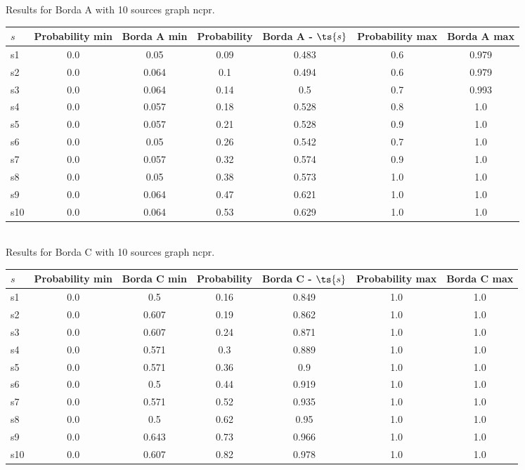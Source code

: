 \documentclass{article}
\begin{document}
\noindent Results for Borda A with 10 sources graph ncpr.

\noindent\begin{tabular}{|l|c|c|c|c|c|c|}
\hline
$s$& Probability min & Borda A min & Probability & Borda A - $\ts{s}$ & Probability max & Borda A max\\
\hline
s1 &0.0 & 0.05 & 0.09 & 0.483 & 0.6 & 0.979\\
\hline
s2 &0.0 & 0.064 & 0.1 & 0.494 & 0.6 & 0.979\\
\hline
s3 &0.0 & 0.064 & 0.14 & 0.5 & 0.7 & 0.993\\
\hline
s4 &0.0 & 0.057 & 0.18 & 0.528 & 0.8 & 1.0\\
\hline
s5 &0.0 & 0.057 & 0.21 & 0.528 & 0.9 & 1.0\\
\hline
s6 &0.0 & 0.05 & 0.26 & 0.542 & 0.7 & 1.0\\
\hline
s7 &0.0 & 0.057 & 0.32 & 0.574 & 0.9 & 1.0\\
\hline
s8 &0.0 & 0.05 & 0.38 & 0.573 & 1.0 & 1.0\\
\hline
s9 &0.0 & 0.064 & 0.47 & 0.621 & 1.0 & 1.0\\
\hline
s10 &0.0 & 0.064 & 0.53 & 0.629 & 1.0 & 1.0\\
\hline
\end{tabular}\\

\noindent Results for Borda C with 10 sources graph ncpr.

\noindent\begin{tabular}{|l|c|c|c|c|c|c|}
\hline
$s$& Probability min & Borda C min & Probability & Borda C - $\ts{s}$ & Probability max & Borda C max\\
\hline
s1 &0.0 & 0.5 & 0.16 & 0.849 & 1.0 & 1.0\\
\hline
s2 &0.0 & 0.607 & 0.19 & 0.862 & 1.0 & 1.0\\
\hline
s3 &0.0 & 0.607 & 0.24 & 0.871 & 1.0 & 1.0\\
\hline
s4 &0.0 & 0.571 & 0.3 & 0.889 & 1.0 & 1.0\\
\hline
s5 &0.0 & 0.571 & 0.36 & 0.9 & 1.0 & 1.0\\
\hline
s6 &0.0 & 0.5 & 0.44 & 0.919 & 1.0 & 1.0\\
\hline
s7 &0.0 & 0.571 & 0.52 & 0.935 & 1.0 & 1.0\\
\hline
s8 &0.0 & 0.5 & 0.62 & 0.95 & 1.0 & 1.0\\
\hline
s9 &0.0 & 0.643 & 0.73 & 0.966 & 1.0 & 1.0\\
\hline
s10 &0.0 & 0.607 & 0.82 & 0.978 & 1.0 & 1.0\\
\hline
\end{tabular}\\
\end{document}
